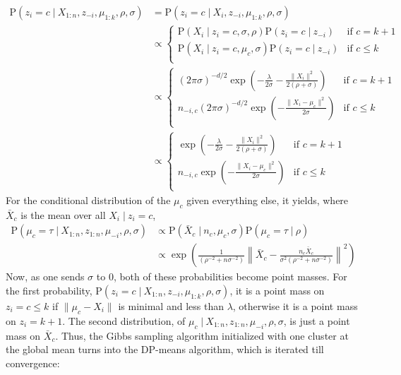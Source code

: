 \documentclass[11pt]{article}
\newcommand{\p}{\mathrm{P}}
\newcommand{\st}{ \; \big | \:}
\theoremstyle{definition}
\begin{document}
\begin{align*} 
    \p(z_i=c \st X_{1:n},z_{-i},\mu_{1:k},\rho,\sigma) &= \p(z_i=c \st X_i,z_{-i},\mu_{1:k},\rho,\sigma) \\
                                           &\propto \begin{cases} 
                                                \p(X_i\st z_i=c,\sigma,\rho)\p(z_i=c\st z_{-i})& \mbox{if } c=k+1 \\ 
                                                \p(X_i\st z_i=c,\mu_c,\sigma)\p(z_i=c\st z_{-i})& \mbox{if } c\leq k \\
                                            \end{cases} \\
                                           &\propto \begin{cases} 
                                                (2\pi\sigma)^{-d/2} \exp\left(-\frac{\lambda}{2\sigma}-\frac{\|X_i\|^2}{2(\rho+\sigma)}\right) & \mbox{if } c=k+1 \\
                                                n_{-i,c}(2\pi\sigma)^{-d/2} \exp\left(-\frac{\|X_i-\mu_c\|^2}{2\sigma}\right) & \mbox{if } c\leq k \\
                                            \end{cases}\\
                                           &\propto \begin{cases} 
                                                \exp\left(-\frac{\lambda}{2\sigma}-\frac{\|X_i\|^2}{2(\rho+\sigma)}\right) & \mbox{if } c=k+1 \\
                                                n_{-i,c}\exp\left(-\frac{\|X_i-\mu_c\|^2}{2\sigma}\right) & \mbox{if } c\leq k \\
                                            \end{cases}
\end{align*}
For the conditional distribution of the $\mu_c$ given everything else, it yields, where $\bar X_c$ is the mean over all $X_i\st z_i=c$,
\begin{align*}
    \p(\mu_c=\tau\st X_{1:n},z_{1:n},\mu_{-i},\rho,\sigma) &\propto \p( \bar X_c \st n_c,\mu_c, \sigma)\p(\mu_c=\tau\st \rho) \\
    &\propto \exp\left(\frac{1}{(\rho^{-2}+n\sigma^{-2})}\left\|\bar X_c - \frac{n_c\bar X_c}{\sigma^2(\rho^{-2}+n\sigma^{-2})}\right\|^2\right)
\end{align*}
Now, as one sends $\sigma$ to $0$, both of these probabilities become point masses. For the first probability, $\p(z_i=c \st X_{1:n},z_{-i},\mu_{1:k},\rho,\sigma)$, it is a point mass on $z_i=c\leq k$ if $\|\mu_c-X_i\|$ is minimal and less than $\lambda$, otherwise it is a point mass on $z_i=k+1$. The second distribution, of $ \mu_c\st X_{1:n},z_{1:n},\mu_{-i},\rho,\sigma$, is just a point mass on $\bar X_c$. Thus, the Gibbs sampling algorithm initialized with one cluster at the global mean turns into the DP-means algorithm, which is iterated till convergence:
\end{document}
